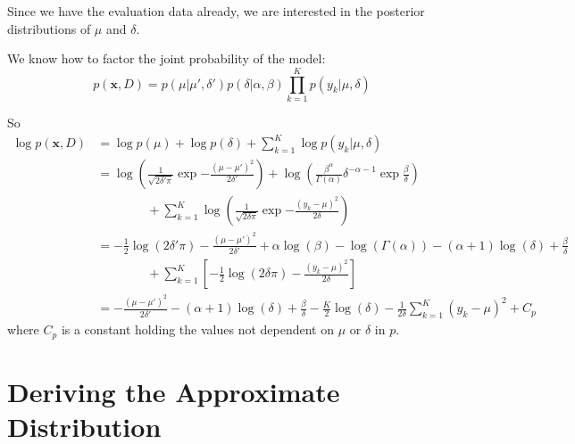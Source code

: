 \documentclass[12pt]{article}
\begin{document}
Since we have the evaluation data already, we are interested in the posterior
distributions of $\mu$ and $\delta$.

We know how to factor the joint probability of the model:
\begin{equation}
    p(\bm{x}, D) = p(\mu|\mu', \delta')p(\delta|\alpha, \beta)\prod_{k=1}^{K}p(y_{k}|\mu, \delta)
\end{equation}

So
\begin{align}
    \log{p(\bm{x}, D)} &= \log{p(\mu)} + \log{p(\delta)} + \sum_{k=1}^{K}
    \log{p(y_{k}|\mu, \delta)} \nonumber \\
    &=
    \log{\left(\frac{1}{\sqrt{2\delta'\pi}}\exp{-\frac{(\mu-\mu')^{2}}{2\delta'}}\right)} +
    \log{\left(\frac{\beta^{\alpha}}{\Gamma(\alpha)}\delta^{-\alpha-1}\exp{\frac{\beta}{\delta}}\right)}
    \nonumber \\
    &\quad\quad\quad\quad+ \sum_{k=1}^{K}
    \log{\left(\frac{1}{\sqrt{2\delta\pi}}\exp{-\frac{(y_{k}-\mu)^{2}}{2\delta}}\right)}
    \nonumber \\
    &= -\frac{1}{2} \log{(2\delta'\pi)} - \frac{(\mu - \mu')^{2}}{2\delta'} +
    \alpha \log{(\beta)} - \log{(\Gamma(\alpha))} - (\alpha + 1) \log{(\delta)}
    + \frac{\beta}{\delta}\nonumber \\
    &\quad\quad\quad\quad+ \sum_{k=1}^{K} \left[-\frac{1}{2}
    \log{(2\delta\pi)} - \frac{(y_{k} - \mu)^{2}}{2\delta}\right] \nonumber \\
    &= -\frac{(\mu-\mu')^{2}}{2\delta'} - (\alpha+1)\log{(\delta)} +
    \frac{\beta}{\delta} - \frac{K}{2}\log{(\delta)} -
    \frac{1}{2\delta}\sum_{k=1}^{K} (y_{k}-\mu)^{2} + C_p
\end{align}
where $C_p$ is a constant holding the values not dependent on $\mu$ or $\delta$
in $p$.

\section{Deriving the Approximate Distribution}
\end{document}

